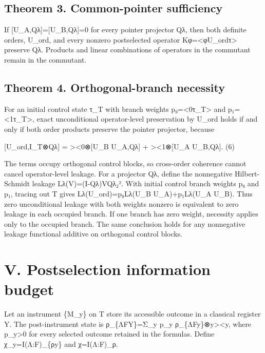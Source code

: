 \documentclass[
]{article}
\begin{document}
\subsection{Theorem 3. Common-pointer
sufficiency}\label{theorem-3.-common-pointer-sufficiency}

If {[}U\_A,Qλ{]}={[}U\_B,Qλ{]}=0 for every pointer projector Qλ, then
both definite orders, U\_ord, and every nonzero postselected operator
Kφ=\textless φ\textbar U\_ord\textbar τ\textgreater{} preserve Qλ.
Products and linear combinations of operators in the commutant remain in
the commutant.

\subsection{Theorem 4. Orthogonal-branch
necessity}\label{theorem-4.-orthogonal-branch-necessity}

For an initial control state τ\_T with branch weights
p₀=\textless0\textbar τ\_T\textgreater{} and
p₁=\textless1\textbar τ\_T\textgreater, exact unconditional
operator-level preservation by U\_ord holds if and only if both order
products preserve the pointer projector, because

{[}U\_ord,I\_T⊗Qλ{]} = \textgreater\textless0\textbar⊗{[}U\_B
U\_A,Qλ{]} + \textgreater\textless1\textbar⊗{[}U\_A U\_B,Qλ{]}.
(6)

The terms occupy orthogonal control blocks, so cross-order coherence
cannot cancel operator-level leakage. For a projector Qλ, define the
nonnegative Hilbert-Schmidt leakage
Lλ(V)=\textbar\textbar(I-Qλ)VQλ\textbar\textbar₂². With initial control
branch weights p₀ and p₁, tracing out T gives Lλ(U\_ord)=p₀Lλ(U\_B
U\_A)+p₁Lλ(U\_A U\_B). Thus zero unconditional leakage with both weights
nonzero is equivalent to zero leakage in each occupied branch. If one
branch has zero weight, necessity applies only to the occupied branch.
The same conclusion holds for any nonnegative leakage functional
additive on orthogonal control blocks.

\section{V. Postselection information
budget}\label{v.-postselection-information-budget}

Let an instrument \{M\_y\} on T store its accessible outcome in a
classical register Y. The post-instrument state is ρ\_\{ΛFY\}=Σ\_y p\_y
ρ\_\{ΛF\textbar y\}⊗\textbar y\textgreater\textless y\textbar, where
p\_y\textgreater0 for every selected outcome retained in the formulas.
Define χ\_y=I(Λ:F)\_\{ρ\textbar y\} and χ=I(Λ:F)\_ρ.
\end{document}
